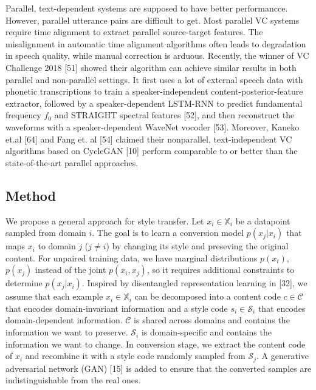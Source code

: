 \documentclass{article}
\begin{document}
Parallel, text-dependent systems are supposed to have better performancce. However, parallel utterance pairs are difficult to get. Most parallel VC systems require time alignment to extract parallel source-target features. The misalignment in automatic time alignment algorithms often leads to degradation in speech quality, while manual correction is arduous. Recently, the winner of VC Challenge 2018 [51] showed their algorithm can achieve similar results in both parallel and non-parallel settings. It first uses a lot of external speech data with phonetic transcriptions to train a speaker-independent content-posterior-feature extractor, followed by a speaker-dependent LSTM-RNN to predict fundamental frequency $f_0$ and STRAIGHT spectral features [52], and then reconstruct the waveforms with a speaker-dependent WaveNet vocoder [53]. Moreover, Kaneko et.al [64] and Fang et. al [54] claimed their nonparallel, text-independent VC algorithms based on CycleGAN [10] perform comparable to or better than the state-of-the-art parallel approaches.





\subsection{Method}
We propose a general approach for style transfer. %
Let $x_i \in \mathbb{X}_i$ be a datapoint sampled from domain $i$. The goal is to learn a conversion model $p(x_j|x_i)$ that maps $x_i$ to domain $j$ ($j\neq i$) by changing its style and preseving the original content. For unpaired training data, we have marginal distributions $p(x_i)$, $p(x_j)$ instead of the joint $p(x_i, x_j)$, so it requires additional constraints to determine $p(x_j|x_i)$. Inspired by disentangled representation learning in [32], we assume that each example $x_i \in \mathbb{X}_i$ can be decomposed into a content code $c\in \mathcal{C}$ that encodes domain-invariant information and a style code $s_i\in \mathcal{S}_i$ that encodes domain-dependent information. $\mathcal{C}$ is shared across domains and contains the information we want to preserve. $\mathcal{S}_i$ is domain-specific and contains the information we want to change. In conversion stage, we extract the content code of $x_i$ and recombine it with a style code randomly sampled from $\mathcal{S}_j$. A generative adversarial network (GAN) [15] is added to ensure that the converted samples are indistinguishable from the real ones.
\end{document}
